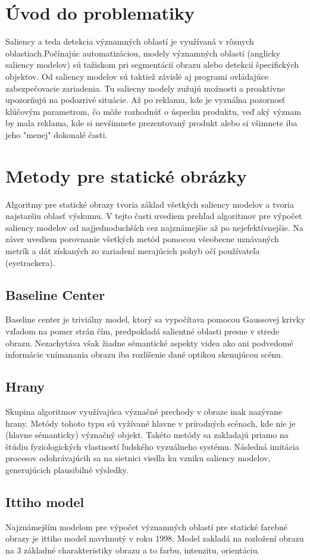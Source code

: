 \section{Úvod do problematiky}
Saliency a teda detekcia významných oblastí je využívaná v rôznych oblastiach.Počínajúc automatizáciou, modely významných oblastí (anglicky saliency modelov) sú tažiskom pri segmentácií obrazu alebo detekcií špecifických objektov.
Od saliency modelov sú taktiež závislé aj programi ovládajúce zabezpečovacie zariadenia.
Tu saliecny modely zužujú možnosti a proaktívne upozorňujú na podozrivé situácie.
Až po reklamu, kde je vyzuálna pozornosť klúčovým parametrom, čo môže rozhodnúť o úspechu produktu, veď aký význam by mala reklama, kde si nevšimnete prezentovaný produkt alebo si všimnete iba jeho "menej" dokonalé časti.
\section{Metody pre statické obrázky}
Algoritmy pre statické obrazy tvoria základ všetkých saliency modelov a tvoria najstaršiu oblasť výskumu.
V tejto časti uvediem prehľad algoritmov pre výpočet saliency modelov od najjednoduchších cez najznámejšie až po nejefektívnejšie.
Na záver uvediem porovnanie všetkých metód pomocou všeobecne uznávaných metrík a dát získaných zo zariadení merajúcich pohyb očí používateľa (eyetrackera).
\subsection{Baseline Center}\label{section:caseline-center}
Baseline center je triviálny model,  ktorý sa vypočítava pomocou Gaussovej krivky vzľadom na pomer strán čím, predpokladá salientné oblasti presne v strede obrazu.
Nezachytáva však žiadne sémantické aspekty videa ako ani podvedomé informácie vnímanania obrazu iba rozlíšenie dané optikou skenujúcou scénu.
\subsection{Hrany}
Skupina algoritmov využívajúca význačné prechody v obraze inak nazývane hrany.
Metódy tohoto typu sú vyžívané hlavne v prírodných scénach, kde nie je (hlavne sémanticky) význačný objekt.
Takéto metódy sa zakladajú priamo na štúdiu fyziologických vlastností ľudského vyzuálneho systému.
Následná imitácia procesov odohrávajúcih sa na sietnici viedla ku vzniku saliency modelov, generujúcich plausibilné výsledky\cite{edges-1}.
\subsection{Ittiho model}
Najznámejším modelom pre výpočet významných oblastí pre statické farebné obrazy je ittiho model navrhnutý v roku 1998.
Model zakladá na rozložení obrazu na 3 základné charakteristiky obrazu a to farbu, intenzitu, orientáciu.

